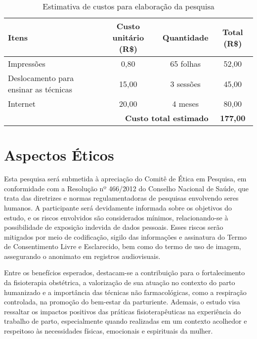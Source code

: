 \documentclass[openright]{normas-utf-tex}
\begin{document}
\begin{table}[H]
    \centering
    \caption{Estimativa de custos para elaboração da pesquisa}
    \label{tab:orcamento}
    \begin{tabular}{|p{5cm}|c|c|c|}
        \hline
        \textbf{Itens} & \textbf{Custo unitário (R\$)} & \textbf{Quantidade} & \textbf{Total (R\$)} \\
        \hline
        Impressões & 0,80 & 65 folhas & 52,00 \\
        Deslocamento para ensinar as técnicas & 15,00 & 3 sessões & 45,00 \\
        Internet & 20,00 & 4 meses & 80,00 \\
        \hline
        \multicolumn{3}{|r|}{\textbf{Custo total estimado}} & \textbf{177,00} \\
        \hline
    \end{tabular}
    \vspace{0.5em}
\end{table}

\section{Aspectos Éticos}
\label{sec:etica}

Esta pesquisa será submetida à apreciação do Comitê de Ética em Pesquisa, em conformidade com a Resolução nº 466/2012 do Conselho Nacional de Saúde, que trata das diretrizes e normas regulamentadoras de pesquisas envolvendo seres humanos. A participante será devidamente informada sobre os objetivos do estudo, e os riscos envolvidos são considerados mínimos, relacionando-se à possibilidade de exposição indevida de dados pessoais. Esses riscos serão mitigados por meio de codificação, sigilo das informações e assinatura do Termo de Consentimento Livre e Esclarecido, bem como do termo de uso de imagem, assegurando o anonimato em registros audiovisuais.

Entre os benefícios esperados, destacam-se a contribuição para o fortalecimento da fisioterapia obstétrica, a valorização de sua atuação no contexto do parto humanizado e a importância das técnicas não farmacológicas, como a respiração controlada, na promoção do bem-estar da parturiente. Ademais, o estudo visa ressaltar os impactos positivos das práticas fisioterapêuticas na experiência do trabalho de parto, especialmente quando realizadas em um contexto acolhedor e respeitoso às necessidades físicas, emocionais e espirituais da mulher.


\end{document}
